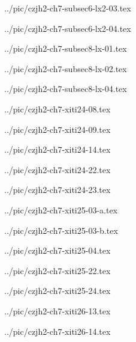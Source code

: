 

../pic/czjh2-ch7-subsec6-lx2-03.tex



../pic/czjh2-ch7-subsec6-lx2-04.tex



../pic/czjh2-ch7-subsec8-lx-01.tex



../pic/czjh2-ch7-subsec8-lx-02.tex



../pic/czjh2-ch7-subsec8-lx-04.tex



../pic/czjh2-ch7-xiti24-08.tex



../pic/czjh2-ch7-xiti24-09.tex



../pic/czjh2-ch7-xiti24-14.tex



../pic/czjh2-ch7-xiti24-22.tex



../pic/czjh2-ch7-xiti24-23.tex



../pic/czjh2-ch7-xiti25-03-a.tex



../pic/czjh2-ch7-xiti25-03-b.tex



../pic/czjh2-ch7-xiti25-04.tex



../pic/czjh2-ch7-xiti25-22.tex



../pic/czjh2-ch7-xiti25-24.tex



../pic/czjh2-ch7-xiti26-13.tex



../pic/czjh2-ch7-xiti26-14.tex

